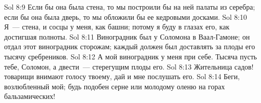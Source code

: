 \vs Sol 8:9 Если бы она была стена, то мы построили бы на ней палаты из серебра; если бы она была дверь, то мы обложили бы ее кедровыми досками.
\vs Sol 8:10 Я~--- стена, и сосцы у меня, как башни; потому я буду в глазах его, как достигшая полноты.
\rsbpar\vs Sol 8:11 Виноградник был у Соломона в Ваал-Гамоне; он отдал этот виноградник сторожам; каждый должен был доставлять за плоды его тысячу сребреников.
\vs Sol 8:12 А мой виноградник у меня при себе. Тысяча пусть тебе, Соломон, а двести~--- стерегущим плоды его.
\vs Sol 8:13 Жительница садов! товарищи внимают голосу твоему, дай и мне послушать его.
\rsbpar\vs Sol 8:14 Беги, возлюбленный мой; будь подобен серне или молодому оленю на горах бальзамических!
